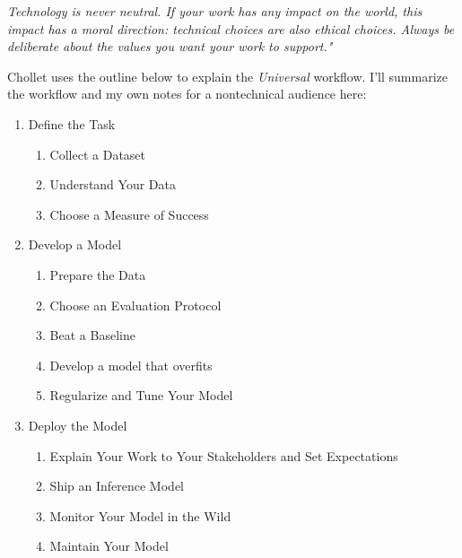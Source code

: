 \textit{Technology is never neutral. If your work has any impact on the world, this impact has a moral direction: technical choices are also ethical choices. Always be deliberate about the values you want your work to support."}\cite{chollet2022}

Chollet uses the outline below to explain the \textit{Universal} workflow. I'll summarize the workflow and my own notes for a nontechnical audience here:
\begin{enumerate}
    \item Define the Task 
    \begin{enumerate}
        \item Collect a Dataset 
        \item Understand Your Data 
        \item Choose a Measure of Success  
    \end{enumerate}
    \item Develop a Model
    \begin{enumerate}
        \item Prepare the Data 
        \item Choose an Evaluation Protocol
        \item Beat a Baseline 
        \item Develop a model that overfits 
        \item Regularize and Tune Your Model
    \end{enumerate}
    \item Deploy the Model
    \begin{enumerate}
        \item Explain Your Work to Your Stakeholders and Set Expectations
        \item Ship an Inference Model
        \item Monitor Your Model in the Wild
        \item Maintain Your Model
    \end{enumerate}
\end{enumerate}

